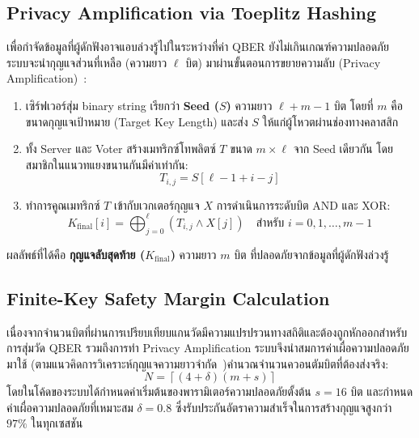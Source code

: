 \subsection{Privacy Amplification via Toeplitz Hashing}
เพื่อกำจัดข้อมูลที่ผู้ดักฟังอาจแอบล่วงรู้ไปในระหว่างที่ค่า QBER ยังไม่เกินเกณฑ์ความปลอดภัย ระบบจะนำกุญแจส่วนที่เหลือ (ความยาว $\ell$ บิต) มาผ่านขั้นตอนการขยายความลับ (Privacy Amplification)~\cite{bennett_privacy_amp_1995, impagliazzo_leftover_hash, krawczyk_toeplitz}:
\begin{enumerate}
    \item เซิร์ฟเวอร์สุ่ม binary string เรียกว่า \textbf{Seed ($S$)} ความยาว $\ell + m - 1$ บิต โดยที่ $m$ คือขนาดกุญแจเป้าหมาย (Target Key Length) และส่ง $S$ ให้แก่ผู้โหวตผ่านช่องทางคลาสสิก
    \item ทั้ง Server และ Voter สร้างเมทริกซ์โทพลิตซ์ $T$ ขนาด $m \times \ell$ จาก Seed เดียวกัน โดยสมาชิกในแนวทแยงขนานกันมีค่าเท่ากัน:
    \begin{equation}
        T_{i, j} = S[\ell - 1 + i - j]
    \end{equation}
    \item ทำการคูณเมทริกซ์ $T$ เข้ากับเวกเตอร์กุญแจ $X$ การดำเนินการระดับบิต AND และ XOR:
    \begin{equation}
        K_{\text{final}}[i] = \bigoplus_{j=0}^{\ell} (T_{i, j} \land X[j]) \quad \text{สำหรับ } i = 0, 1, \dots, m-1
    \end{equation}
\end{enumerate}
ผลลัพธ์ที่ได้คือ \textbf{กุญแจลับสุดท้าย ($K_{\text{final}}$)} ความยาว $m$ บิต ที่ปลอดภัยจากข้อมูลที่ผู้ดักฟังล่วงรู้

\subsection{Finite-Key Safety Margin Calculation}
เนื่องจากจำนวนบิตที่ผ่านการเปรียบเทียบแกนวัดมีความแปรปรวนทางสถิติและต้องถูกหักออกสำหรับการสุ่มวัด QBER รวมถึงการทำ Privacy Amplification ระบบจึงนำสมการค่าเผื่อความปลอดภัยมาใช้ (ตามแนวคิดการวิเคราะห์กุญแจความยาวจำกัด~\cite{tomamichel_finite_key_2012})คำนวณจำนวนควอนตัมบิตที่ต้องส่งจริง:
\begin{equation}
    N = \left\lceil (4 + \delta)(m + s) \right\rceil
\end{equation}
โดยในโค้ดของระบบได้กำหนดค่าเริ่มต้นของพารามิเตอร์ความปลอดภัยตั้งต้น $s = 16$ บิต และกำหนดค่าเผื่อความปลอดภัยที่เหมาะสม $\delta = 0.8$ ซึ่งรับประกันอัตราความสำเร็จในการสร้างกุญแจสูงกว่า $97\%$ ในทุกเซสชัน

